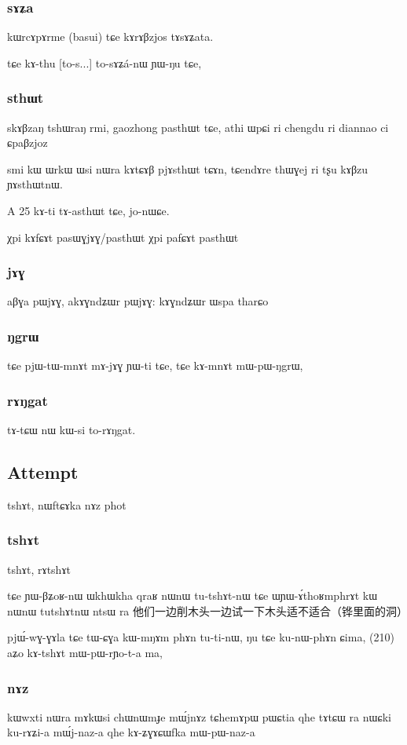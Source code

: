 \documentclass[oldfontcommands,oneside,a4paper,11pt]{article}
\begin{document}
\subsubsection{sɤʑa}
kɯrcɤpɤrme (basui) tɕe kɤrɤβzjos tɤsɤʑata.

tɕe kɤ-thu [to-s...] to-sɤʑá-nɯ ɲɯ-ŋu tɕe,
\subsubsection{sthɯt}
skɤβzaŋ tshɯraŋ rmi, gaozhong pasthɯt tɕe, athi ɯpɕi ri 
chengdu ri diannao ci ɕpaβzjoz

smi kɯ ɯrkɯ ɯsi nɯra kɤtɕɤβ pjɤsthɯt tɕɤn,
tɕendɤre thɯɣej ri tʂu kɤβzu ɲɤsthɯtnɯ.

A	25	kɤ-ti	tɤ-asthɯt	tɕe,	jo-nɯɕe.		
 
χpi kɤfɕɤt pasɯɣjɤɣ/pasthɯt
χpi pafɕɤt pasthɯt
\subsubsection{jɤɣ}
aβɣa pɯjɤɣ, akɤɣndʑɯr pɯjɤɣ: kɤɣndʑɯr ɯspa tharɕo

\subsubsection{ŋgrɯ}

tɕe pjɯ-tɯ-mnɤt mɤ-jɤɣ ɲɯ-ti tɕe, 
tɕe kɤ-mnɤt mɯ-pɯ-ŋgrɯ,
\subsubsection{rɤŋgat}
tɤ-tɕɯ nɯ kɯ-si to-rɤŋgat.

\subsection{Attempt}
tshɤt,  nɯftɕɤka
nɤz
phot

\subsubsection{tshɤt}
tshɤt, rɤtshɤt

tɕe ɲɯ-βʑoʁ-nɯ ɯkhɯkha qraʁ nɯnɯ tu-tshɤt-nɯ tɕe
ɯɲɯ-ɤ́thoʁmphrɤt kɯ nɯnɯ tutshɤtnɯ ntsɯ ra
他们一边削木头一边试一下木头适不适合（铧里面的洞）

pjɯ́-wɣ-ɣɤla tɕe tɯ-ɕɣa kɯ-mŋɤm phɤn tu-ti-nɯ,
ŋu tɕe ku-nɯ-phɤn ɕima,  (210)
aʑo kɤ-tshɤt mɯ-pɯ-rɲo-t-a ma,
\subsubsection{nɤz}
kɯwxti nɯra mɤkɯsi chɯnɯmɟe mɯ́jnɤz
tɕhemɤpɯ pɯɕtia qhe tɤtɕɯ ra nɯɕki ku-rɤʑi-a mɯ́j-naz-a qhe
kɤ-ʑɣɤɕɯfka mɯ-pɯ-naz-a
\end{document}

